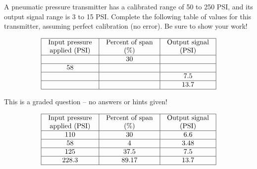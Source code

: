 

A pneumatic pressure transmitter has a calibrated range of 50 to 250 PSI, and its output signal range is 3 to 15 PSI.  Complete the following table of values for this transmitter, assuming perfect calibration (no error).  Be sure to show your work!


$$\vbox{\offinterlineskip
\halign{\strut
\vrule \quad\hfil # \ \hfil & 
\vrule \quad\hfil # \ \hfil & 
\vrule \quad\hfil # \ \hfil \vrule \cr
\noalign{\hrule}
%
Input pressure & Percent of span & Output signal \cr
%
applied (PSI) & (\%) & (PSI) \cr
%
\noalign{\hrule}
%
 & 30 &  \cr
%
\noalign{\hrule}
%
58 &  &  \cr
%
\noalign{\hrule}
%
 &  & 7.5 \cr
%
\noalign{\hrule}
%
 &  & 13.7 \cr
%
\noalign{\hrule}
} %
}$$ %


\vfil 

\eject






This is a graded question -- no answers or hints given!








$$\vbox{\offinterlineskip
\halign{\strut
\vrule \quad\hfil # \ \hfil & 
\vrule \quad\hfil # \ \hfil & 
\vrule \quad\hfil # \ \hfil \vrule \cr
\noalign{\hrule}
%
Input pressure & Percent of span & Output signal \cr
%
applied (PSI) & (\%) & (PSI) \cr
%
\noalign{\hrule}
%
110 & 30 & 6.6 \cr
%
\noalign{\hrule}
%
58 & 4 & 3.48 \cr
%
\noalign{\hrule}
%
125 & 37.5 & 7.5 \cr
%
\noalign{\hrule}
%
228.3 & 89.17 & 13.7 \cr
%
\noalign{\hrule}
} %
}$$ %




